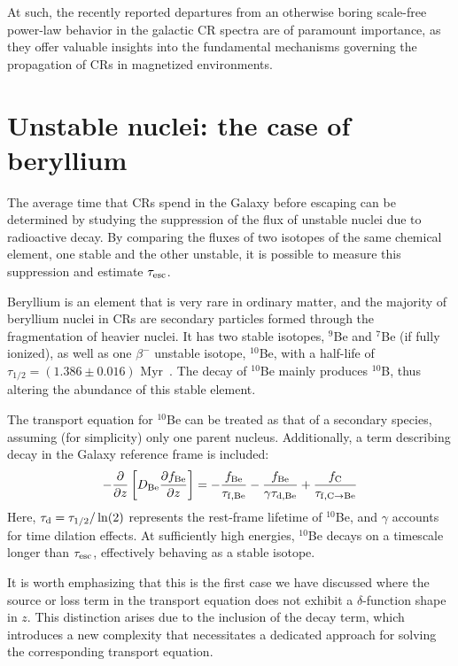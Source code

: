 At such, the recently reported departures from an otherwise boring scale-free power-law behavior in the galactic CR spectra are of paramount importance, as they offer valuable insights into the fundamental mechanisms governing the propagation of CRs in magnetized environments.

\section{Unstable nuclei: the case of beryllium}
\label{sec:unstable}

The average time that CRs spend in the Galaxy before escaping can be determined by studying the suppression of the flux of unstable nuclei due to radioactive decay. By comparing the fluxes of two isotopes of the same chemical element, one stable and the other unstable, it is possible to measure this suppression and estimate $\tau_{\rm esc}$.

Beryllium is an element that is very rare in ordinary matter, and the majority of beryllium nuclei in CRs are secondary particles formed through the fragmentation of heavier nuclei. 
%
It has two stable isotopes, $^9$Be and $^7$Be (if fully ionized), as well as one $\beta^-$ unstable isotope, $^{10}$Be, with a half-life of $\tau_{1/2} = (1.386 \pm 0.016)$ Myr~\cite{Chmeleff2010nimb}. 
%
The decay of $^{10}$Be mainly produces $^{10}$B, thus altering the abundance of this stable element.

The transport equation for $^{10}$Be can be treated as that of a secondary species, assuming (for simplicity) only one parent nucleus. 
%
Additionally, a term describing decay in the Galaxy reference frame is included:
%
\begin{equation}
-\frac{\partial}{\partial z} \left[ D_{\rm Be} \frac{\partial f_{\rm Be}}{\partial z} \right] =
- \frac{f_{\rm Be}}{\tau_{\rm f, Be}} 
- \frac{f_{\rm Be}}{\gamma \tau_{\rm d, Be}} 
+ \frac{f_{\rm C}}{\tau_{\rm f, C \rightarrow Be}} 
\end{equation}
%
Here, $\tau_{\rm d} = \tau_{1/2} / \ln(2)$ represents the rest-frame lifetime of $^{10}$Be, and $\gamma$ accounts for time dilation effects.
%
At sufficiently high energies, $^{10}$Be decays on a timescale longer than $\tau_{\rm esc}$, effectively behaving as a stable isotope.

It is worth emphasizing that this is the first case we have discussed where the source or loss term in the transport equation does not exhibit a $\delta$-function shape in $z$. This distinction arises due to the inclusion of the decay term, which introduces a new complexity that necessitates a dedicated approach for solving the corresponding transport equation.

